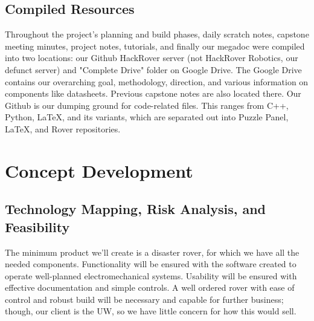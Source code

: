 \documentclass[a4paper, 10pt]{article}
\begin{document}
\pagebreak

\subsection*{Compiled Resources}
	Throughout the project's planning and build phases, daily scratch notes, capstone meeting minutes, project notes, tutorials, and finally our megadoc were compiled into two locations: our Github HackRover server (not HackRover Robotics, our defunct server) and "Complete Drive" folder on Google Drive. The Google Drive contains our overarching goal, methodology, direction, and various information on components like datasheets. Previous capstone notes are also located there. Our Github is our dumping ground for code-related files. This ranges from C++, Python, LaTeX, and its variants, which are separated out into Puzzle Panel, LaTeX, and Rover repositories.
		
\section{Concept Development}
	\subsection{Technology Mapping, Risk Analysis, and Feasibility}
	The minimum product we'll create is a disaster rover, for which we have all the needed components. Functionality will be ensured with the software created to operate well-planned electromechanical systems. Usability will be ensured with effective documentation and simple controls. A well ordered rover with ease of control and robust build will be necessary and capable for further business; though, our client is the UW, so we have little concern for how this would  sell.
	
\end{document}
